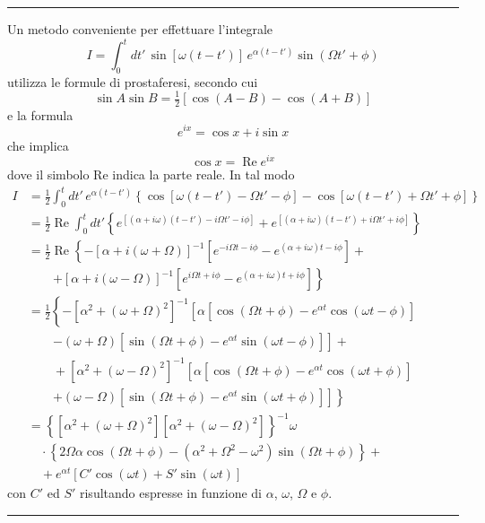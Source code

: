 \documentclass[11pt, a4paper]{book}
\numberwithin{equation}{section}
\begin{document}
\bigskip
\noindent\rule{\textwidth}{0.4pt}
\begin{small}
Un metodo conveniente per effettuare l'integrale
\[
    I = \int_0^t dt' \, \sin[\omega(t-t')] \, e^{\alpha(t-t')} \sin(\Omega t' + \phi)
\]
utilizza le formule di prostaferesi, secondo cui
\[
    \sin A \sin B = \tfrac{1}{2} \left[ \cos(A-B) - \cos(A+B) \right]
\]
e la formula
\[
    e^{ix} = \cos x + i \sin x
\]
che implica
\[
    \cos x = \operatorname{Re} e^{ix}
\]
dove il simbolo Re indica la parte reale. In tal modo
\begin{align*}
    I &= \frac{1}{2} \int_0^t dt' \, e^{\alpha(t-t')} \left\{ \cos[\omega(t-t') - \Omega t' - \phi] - \cos[\omega(t-t') + \Omega t' + \phi] \right\} \\
    &= \frac{1}{2} \operatorname{Re} \int_0^t dt' \left\{ e^{[(\alpha+i\omega)(t-t')-i\Omega t'-i\phi]} + e^{[(\alpha+i\omega)(t-t')+i\Omega t'+i\phi]} \right\} \\
    &= \frac{1}{2} \operatorname{Re} \left\{ -[\alpha+i(\omega+\Omega)]^{-1} \left[ e^{-i\Omega t - i\phi} - e^{(\alpha+i\omega)t - i\phi} \right] + \right. \\
    &\qquad \left. + [\alpha+i(\omega-\Omega)]^{-1} \left[ e^{i\Omega t + i\phi} - e^{(\alpha+i\omega)t + i\phi} \right] \right\} \\
    &= \frac{1}{2} \left\{ - [\alpha^2+(\omega+\Omega)^2]^{-1} \left[ \alpha[\cos(\Omega t+\phi) - e^{\alpha t}\cos(\omega t-\phi)] \right. \right. \\
    &\qquad \left. - (\omega+\Omega)[\sin(\Omega t+\phi) - e^{\alpha t}\sin(\omega t-\phi)] \right] + \\
    &\qquad + [\alpha^2+(\omega-\Omega)^2]^{-1} \left[ \alpha[\cos(\Omega t+\phi) - e^{\alpha t}\cos(\omega t+\phi)] \right. \\
    &\qquad \left. \left. + (\omega-\Omega)[\sin(\Omega t+\phi) - e^{\alpha t}\sin(\omega t+\phi)] \right] \right\} \\
    &= \left\{ [\alpha^2+(\omega+\Omega)^2][\alpha^2+(\omega-\Omega)^2] \right\}^{-1} \omega \\
    &\quad \cdot \left\{ 2\Omega\alpha\cos(\Omega t+\phi) - (\alpha^2+\Omega^2-\omega^2)\sin(\Omega t+\phi) \right\} + \\
    &\quad + e^{\alpha t} \left[ C' \cos(\omega t) + S' \sin(\omega t) \right]
\end{align*}
con $C'$ ed $S'$ risultando espresse in funzione di $\alpha$, $\omega$, $\Omega$ e $\phi$.
\end{small}
\noindent\rule{\textwidth}{0.4pt}
\bigskip
\end{document}
